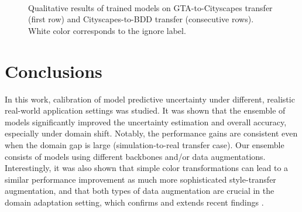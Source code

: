 \documentclass[conference]{IEEEtran}
\begin{document}


\begin{figure*}
\setlength{\tempwidth}{.24\linewidth}
%
\centering
\hspace{\baselineskip}
\hfil
{}\hfil
{}\hfil
{}\\
\hfil
{}\hfil
{}\hfil
{}\\
\hfil
{}\hfil
{}\hfil
{} \\

\hfil
{}\hfil
{}\hfil
{} 

\caption{Qualitative results of trained models on GTA-to-Cityscapes transfer (first row) and Cityscapes-to-BDD transfer (consecutive rows). White color corresponds to the ignore label.}
\label{fig:results}
\end{figure*}


\section{Conclusions}

In this work, calibration of model predictive uncertainty under different, realistic real-world application settings was studied. It was shown that the ensemble of models significantly improved the uncertainty estimation and overall accuracy, especially under domain shift. Notably, the performance gains are consistent even when the domain gap is large (simulation-to-real transfer case). Our ensemble consists of models using different backbones and/or data augmentations. Interestingly, it was also shown that simple color transformations can lead to a similar performance improvement as much more sophisticated style-transfer augmentation, and that both types of data augmentation are crucial in the domain adaptation setting, which confirms and extends recent findings \cite{rethinking}.
\end{document}
